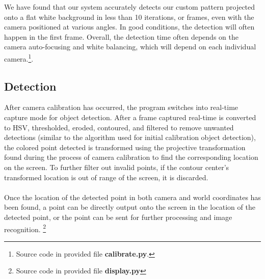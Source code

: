 \documentclass[twoside,twocolumn]{article}
\begin{document}
We have found that our system accurately detects our custom pattern projected onto a flat white background in less than 10 iterations, or frames, even with the camera positioned at various angles. In good conditions, the detection will often happen in the first frame. Overall, the detection time often depends on the camera auto-focusing and white balancing, which will depend on each individual camera.\footnote{Source code in provided file \textbf{calibrate.py}.}.

\subsection{Detection}
After camera calibration has occurred, the program switches into real-time capture mode for object detection. After a frame captured real-time is converted to HSV, thresholded, eroded, contoured, and filtered to remove unwanted detections (similar to the algorithm used for initial calibration object detection), the colored point detected is transformed using the projective transformation found during the process of camera calibration to find the corresponding location on the screen. To further filter out invalid points, if the contour center's transformed location is out of range of the screen, it is discarded.\\ \\ Once the location of the detected point in both camera and world coordinates has been found, a point can be directly output onto the screen in the location of the detected point, or the point can be sent for further processing and image recognition. \footnote{Source code in provided file \textbf{display.py}}
\end{document}

